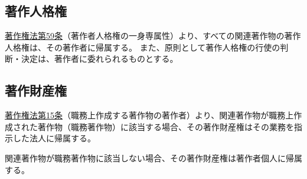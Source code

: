 

\subsection{著作人格権}
\href{https://elaws.e-gov.go.jp/document?lawid=345AC0000000048\#Mp-At_59}{著作権法第59条}（著作者人格権の一身専属性）より、すべての関連著作物の著作人格権は、その著作者に帰属する。
また、原則として著作人格権の行使の判断・決定は、著作者に委れられるものとする。


\subsection{著作財産権}
\href{https://elaws.e-gov.go.jp/document?lawid=345AC0000000048#Mp-At_15}{著作権法第15条}（職務上作成する著作物の著作者）より、関連著作物が職務上作成された著作物（職務著作物）に該当する場合、その著作財産権はその業務を指示した法人に帰属する。

関連著作物が職務著作物に該当しない場合、その著作財産権は著作者個人に帰属する。



